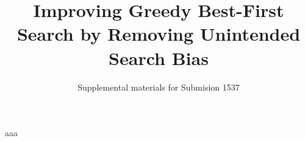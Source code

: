 

\usepackage{pdflscape}
\renewcommand{\thesection}{S\arabic{section}}
\renewcommand{\thetable}{S\arabic{table}}
\renewcommand{\thefigure}{S\arabic{figure}}

\pagestyle{empty}

\nocopyright
\author{Supplemental materials for Submision 1537}
\title{Improving Greedy Best-First Search by Removing Unintended Search Bias}


\onecolumn
\makeatletter
\@maketitle
\makeatother

\begin{landscape}
aaa
\end{landscape}

\fontsize{9.5pt}{10.5pt}
\selectfont
 


% 
% 
% 
% 


